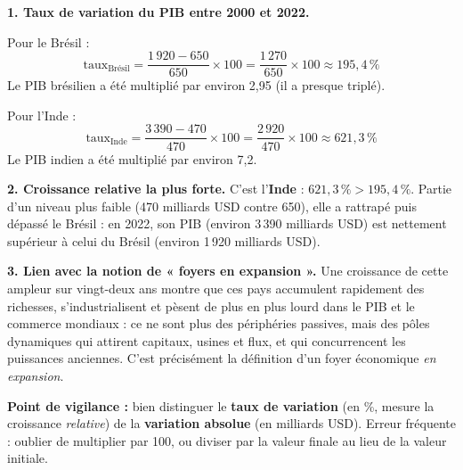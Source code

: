 \documentclass[11pt]{article}
\begin{document}
\begin{corrige}
\textbf{1. Taux de variation du PIB entre 2000 et 2022.}

Pour le Brésil :
\[
\text{taux}_{\text{Brésil}} = \dfrac{1\,920 - 650}{650} \times 100 = \dfrac{1\,270}{650} \times 100 \approx 195,4\,\%
\]
Le PIB brésilien a été multiplié par environ 2,95 (il a presque triplé).

Pour l'Inde :
\[
\text{taux}_{\text{Inde}} = \dfrac{3\,390 - 470}{470} \times 100 = \dfrac{2\,920}{470} \times 100 \approx 621,3\,\%
\]
Le PIB indien a été multiplié par environ 7,2.

\textbf{2. Croissance relative la plus forte.} C'est l'\textbf{Inde} : $621,3\,\% > 195,4\,\%$. Partie d'un niveau plus faible (470 milliards USD contre 650), elle a rattrapé puis dépassé le Brésil : en 2022, son PIB (environ 3\,390 milliards USD) est nettement supérieur à celui du Brésil (environ 1\,920 milliards USD).

\textbf{3. Lien avec la notion de « foyers en expansion ».} Une croissance de cette ampleur sur vingt-deux ans montre que ces pays accumulent rapidement des richesses, s'industrialisent et pèsent de plus en plus lourd dans le PIB et le commerce mondiaux : ce ne sont plus des périphéries passives, mais des pôles dynamiques qui attirent capitaux, usines et flux, et qui concurrencent les puissances anciennes. C'est précisément la définition d'un foyer économique \emph{en expansion}.

\textbf{Point de vigilance :} bien distinguer le \textbf{taux de variation} (en \%, mesure la croissance \emph{relative}) de la \textbf{variation absolue} (en milliards USD). Erreur fréquente : oublier de multiplier par 100, ou diviser par la valeur finale au lieu de la valeur initiale.
\end{corrige}
\end{document}
